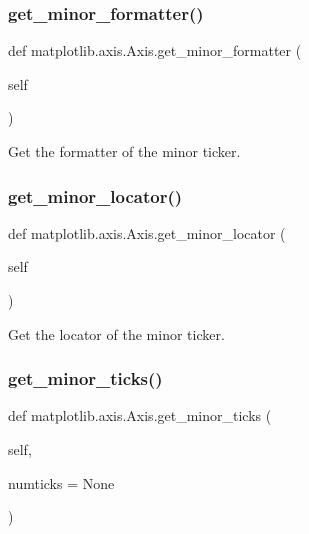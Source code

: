 \subsubsection{\texorpdfstring{get\+\_\+minor\+\_\+formatter()}{get\_minor\_formatter()}}
{\footnotesize\ttfamily def matplotlib.\+axis.\+Axis.\+get\+\_\+minor\+\_\+formatter (\begin{DoxyParamCaption}\item[{}]{self }\end{DoxyParamCaption})}

\begin{DoxyVerb}Get the formatter of the minor ticker.\end{DoxyVerb}
 \mbox{\label{classmatplotlib_1_1axis_1_1Axis_a64e17f35da9f4c68bfd86c570f51c64a}} 
\subsubsection{\texorpdfstring{get\+\_\+minor\+\_\+locator()}{get\_minor\_locator()}}
{\footnotesize\ttfamily def matplotlib.\+axis.\+Axis.\+get\+\_\+minor\+\_\+locator (\begin{DoxyParamCaption}\item[{}]{self }\end{DoxyParamCaption})}

\begin{DoxyVerb}Get the locator of the minor ticker.\end{DoxyVerb}
 \mbox{\label{classmatplotlib_1_1axis_1_1Axis_af42124289f35cdf18ea5f3f385b98cbf}} 
\subsubsection{\texorpdfstring{get\+\_\+minor\+\_\+ticks()}{get\_minor\_ticks()}}
{\footnotesize\ttfamily def matplotlib.\+axis.\+Axis.\+get\+\_\+minor\+\_\+ticks (\begin{DoxyParamCaption}\item[{}]{self,  }\item[{}]{numticks = {\ttfamily None} }\end{DoxyParamCaption})}

